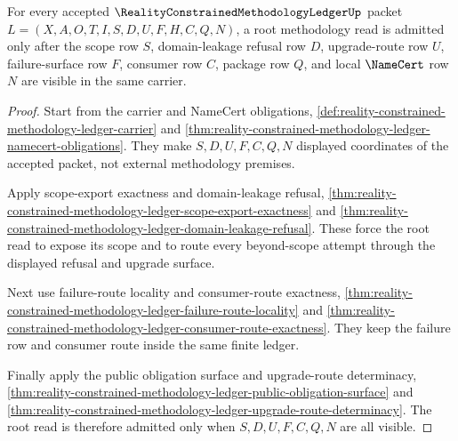 \begin{theorem}
\label{thm:reality-constrained-methodology-ledger-root-scope-admission}
For every accepted $\RealityConstrainedMethodologyLedgerUp$ packet
$L=(X,A,O,T,I,S,D,U,F,H,C,Q,N)$, a root methodology read is admitted only after
the scope row $S$, domain-leakage refusal row $D$, upgrade-route row $U$,
failure-surface row $F$, consumer row $C$, package row $Q$, and local
$\NameCert$ row $N$ are visible in the same carrier.
\end{theorem}
\begin{proof}
Start from the carrier and NameCert obligations,
\autoref{def:reality-constrained-methodology-ledger-carrier} and
\autoref{thm:reality-constrained-methodology-ledger-namecert-obligations}. They
make $S,D,U,F,C,Q,N$ displayed coordinates of the accepted packet, not external
methodology premises.

Apply scope-export exactness and domain-leakage refusal,
\autoref{thm:reality-constrained-methodology-ledger-scope-export-exactness} and
\autoref{thm:reality-constrained-methodology-ledger-domain-leakage-refusal}.
These force the root read to expose its scope and to route every beyond-scope
attempt through the displayed refusal and upgrade surface.

Next use failure-route locality and consumer-route exactness,
\autoref{thm:reality-constrained-methodology-ledger-failure-route-locality} and
\autoref{thm:reality-constrained-methodology-ledger-consumer-route-exactness}.
They keep the failure row and consumer route inside the same finite ledger.

Finally apply the public obligation surface and upgrade-route determinacy,
\autoref{thm:reality-constrained-methodology-ledger-public-obligation-surface}
and
\autoref{thm:reality-constrained-methodology-ledger-upgrade-route-determinacy}.
The root read is therefore admitted only when $S,D,U,F,C,Q,N$ are all visible.
\end{proof}

